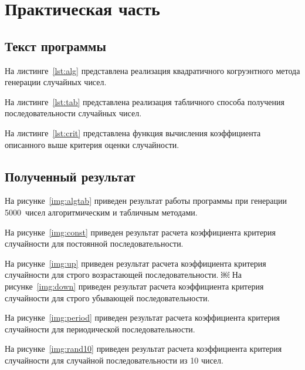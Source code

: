 \chapter{Практическая часть}

\section{Текст программы}

{
\captionsetup{format=hang,justification=raggedright,
              singlelinecheck=off,width=16cm}
На листинге~\ref{lst:alg} представлена реализация квадратичного
когруэнтного метода генерации случайных чисел.


\clearpage
На листинге~\ref{lst:tab} представлена реализация табличного способа
получения последовательности случайных чисел.


\clearpage
На листинге~\ref{lst:crit} представлена функция вычисления коэффициента
описанного выше критерия оценки случайности.

}

\section{Полученный результат}

На рисунке~\ref{img:algtab} приведен результат работы программы при генерации
5000~чисел алгоритмическим и табличным методами.

На рисунке~\ref{img:const} приведен результат расчета коэффициента критерия
случайности для постоянной последовательности.

На рисунке~\ref{img:up} приведен результат расчета коэффициента критерия
случайности для строго возрастающей последовательности.
￼
На рисунке~\ref{img:down} приведен результат расчета коэффициента критерия
случайности для строго убывающей последовательности.

На рисунке~\ref{img:period} приведен результат расчета коэффициента критерия
случайности для периодической последовательности.

На рисунке~\ref{img:rand10} приведен результат расчета коэффициента критерия
случайности для случайной последовательности из 10 чисел.
